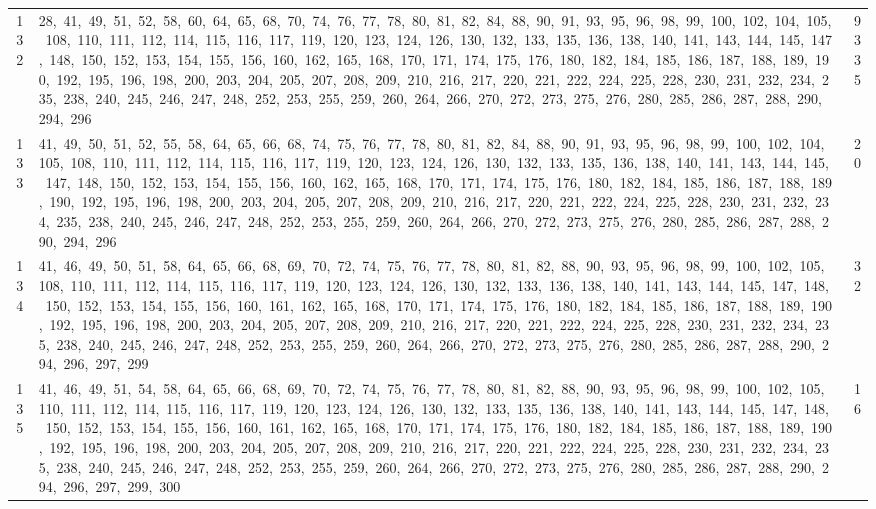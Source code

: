 \begin{longtable}{c|p{}|r}
132 & 28,\ 41,\ 49,\ 51,\ 52,\ 58,\ 60,\ 64,\ 65,\ 68,\ 70,\ 74,\ 76,\ 77,\ 78,\ 80,\ 81,\ 82,\ 84,\ 88,\ 90,\ 91,\ 93,\ 95,\ 96,\ 98,\ 99,\ 100,\ 102,\ 104,\ 105,\ 108,\ 110,\ 111,\ 112,\ 114,\ 115,\ 116,\ 117,\ 119,\ 120,\ 123,\ 124,\ 126,\ 130,\ 132,\ 133,\ 135,\ 136,\ 138,\ 140,\ 141,\ 143,\ 144,\ 145,\ 147,\ 148,\ 150,\ 152,\ 153,\ 154,\ 155,\ 156,\ 160,\ 162,\ 165,\ 168,\ 170,\ 171,\ 174,\ 175,\ 176,\ 180,\ 182,\ 184,\ 185,\ 186,\ 187,\ 188,\ 189,\ 190,\ 192,\ 195,\ 196,\ 198,\ 200,\ 203,\ 204,\ 205,\ 207,\ 208,\ 209,\ 210,\ 216,\ 217,\ 220,\ 221,\ 222,\ 224,\ 225,\ 228,\ 230,\ 231,\ 232,\ 234,\ 235,\ 238,\ 240,\ 245,\ 246,\ 247,\ 248,\ 252,\ 253,\ 255,\ 259,\ 260,\ 264,\ 266,\ 270,\ 272,\ 273,\ 275,\ 276,\ 280,\ 285,\ 286,\ 287,\ 288,\ 290,\ 294,\ 296 & 9335 \\
133 & 41,\ 49,\ 50,\ 51,\ 52,\ 55,\ 58,\ 64,\ 65,\ 66,\ 68,\ 74,\ 75,\ 76,\ 77,\ 78,\ 80,\ 81,\ 82,\ 84,\ 88,\ 90,\ 91,\ 93,\ 95,\ 96,\ 98,\ 99,\ 100,\ 102,\ 104,\ 105,\ 108,\ 110,\ 111,\ 112,\ 114,\ 115,\ 116,\ 117,\ 119,\ 120,\ 123,\ 124,\ 126,\ 130,\ 132,\ 133,\ 135,\ 136,\ 138,\ 140,\ 141,\ 143,\ 144,\ 145,\ 147,\ 148,\ 150,\ 152,\ 153,\ 154,\ 155,\ 156,\ 160,\ 162,\ 165,\ 168,\ 170,\ 171,\ 174,\ 175,\ 176,\ 180,\ 182,\ 184,\ 185,\ 186,\ 187,\ 188,\ 189,\ 190,\ 192,\ 195,\ 196,\ 198,\ 200,\ 203,\ 204,\ 205,\ 207,\ 208,\ 209,\ 210,\ 216,\ 217,\ 220,\ 221,\ 222,\ 224,\ 225,\ 228,\ 230,\ 231,\ 232,\ 234,\ 235,\ 238,\ 240,\ 245,\ 246,\ 247,\ 248,\ 252,\ 253,\ 255,\ 259,\ 260,\ 264,\ 266,\ 270,\ 272,\ 273,\ 275,\ 276,\ 280,\ 285,\ 286,\ 287,\ 288,\ 290,\ 294,\ 296 & 20 \\
134 & 41,\ 46,\ 49,\ 50,\ 51,\ 58,\ 64,\ 65,\ 66,\ 68,\ 69,\ 70,\ 72,\ 74,\ 75,\ 76,\ 77,\ 78,\ 80,\ 81,\ 82,\ 88,\ 90,\ 93,\ 95,\ 96,\ 98,\ 99,\ 100,\ 102,\ 105,\ 108,\ 110,\ 111,\ 112,\ 114,\ 115,\ 116,\ 117,\ 119,\ 120,\ 123,\ 124,\ 126,\ 130,\ 132,\ 133,\ 136,\ 138,\ 140,\ 141,\ 143,\ 144,\ 145,\ 147,\ 148,\ 150,\ 152,\ 153,\ 154,\ 155,\ 156,\ 160,\ 161,\ 162,\ 165,\ 168,\ 170,\ 171,\ 174,\ 175,\ 176,\ 180,\ 182,\ 184,\ 185,\ 186,\ 187,\ 188,\ 189,\ 190,\ 192,\ 195,\ 196,\ 198,\ 200,\ 203,\ 204,\ 205,\ 207,\ 208,\ 209,\ 210,\ 216,\ 217,\ 220,\ 221,\ 222,\ 224,\ 225,\ 228,\ 230,\ 231,\ 232,\ 234,\ 235,\ 238,\ 240,\ 245,\ 246,\ 247,\ 248,\ 252,\ 253,\ 255,\ 259,\ 260,\ 264,\ 266,\ 270,\ 272,\ 273,\ 275,\ 276,\ 280,\ 285,\ 286,\ 287,\ 288,\ 290,\ 294,\ 296,\ 297,\ 299 & 32 \\
135 & 41,\ 46,\ 49,\ 51,\ 54,\ 58,\ 64,\ 65,\ 66,\ 68,\ 69,\ 70,\ 72,\ 74,\ 75,\ 76,\ 77,\ 78,\ 80,\ 81,\ 82,\ 88,\ 90,\ 93,\ 95,\ 96,\ 98,\ 99,\ 100,\ 102,\ 105,\ 110,\ 111,\ 112,\ 114,\ 115,\ 116,\ 117,\ 119,\ 120,\ 123,\ 124,\ 126,\ 130,\ 132,\ 133,\ 135,\ 136,\ 138,\ 140,\ 141,\ 143,\ 144,\ 145,\ 147,\ 148,\ 150,\ 152,\ 153,\ 154,\ 155,\ 156,\ 160,\ 161,\ 162,\ 165,\ 168,\ 170,\ 171,\ 174,\ 175,\ 176,\ 180,\ 182,\ 184,\ 185,\ 186,\ 187,\ 188,\ 189,\ 190,\ 192,\ 195,\ 196,\ 198,\ 200,\ 203,\ 204,\ 205,\ 207,\ 208,\ 209,\ 210,\ 216,\ 217,\ 220,\ 221,\ 222,\ 224,\ 225,\ 228,\ 230,\ 231,\ 232,\ 234,\ 235,\ 238,\ 240,\ 245,\ 246,\ 247,\ 248,\ 252,\ 253,\ 255,\ 259,\ 260,\ 264,\ 266,\ 270,\ 272,\ 273,\ 275,\ 276,\ 280,\ 285,\ 286,\ 287,\ 288,\ 290,\ 294,\ 296,\ 297,\ 299,\ 300 & 16 \\

\end{longtable}
